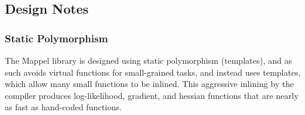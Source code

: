 \subsection*{Design Notes}

\subsubsection*{Static Polymorphism}

The Mappel library is designed using static polymorphism (templates), and as such avoids virtual functions for small-\/grained tasks, and instead uses templates, which allow many small functions to be inlined. This aggressive inlining by the compiler produces log-\/likelihood, gradient, and hessian functions that are nearly as fast as hand-\/coded functions. 